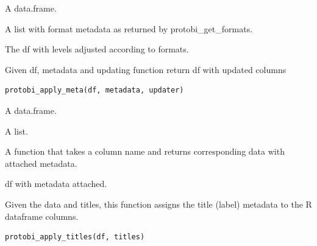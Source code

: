 \documentclass[a4paper]{book}
\begin{document}
\begin{Arguments}
\begin{ldescription}
\item[\code{df}] A data.frame.

\item[\code{formats}] A list with format metadata as returned by protobi\_get\_formats.
\end{ldescription}
\end{Arguments}
%
\begin{Value}
The df with levels adjusted according to formats.
\end{Value}
%
\begin{Description}\relax
Given df, metadata and updating function return df with updated columns
\end{Description}
%
\begin{Usage}
\begin{verbatim}
protobi_apply_meta(df, metadata, updater)
\end{verbatim}
\end{Usage}
%
\begin{Arguments}
\begin{ldescription}
\item[\code{df}] A data.frame.

\item[\code{metadata}] A list.

\item[\code{updater}] A function that takes a column name and returns corresponding data with attached metadata.
\end{ldescription}
\end{Arguments}
%
\begin{Value}
df with metadata attached.
\end{Value}
%
\begin{Description}\relax
Given the data and titles, this function assigns the title (label) metadata to the R dataframe columns.
\end{Description}
%
\begin{Usage}
\begin{verbatim}
protobi_apply_titles(df, titles)
\end{verbatim}
\end{Usage}
\end{document}
